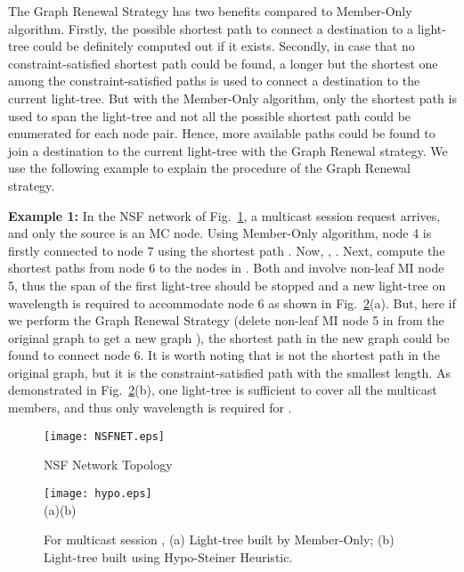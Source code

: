 \documentclass[conference]{IEEEtran}
\begin{document}
The Graph Renewal Strategy has two benefits compared to Member-Only algorithm. Firstly, the possible shortest path to connect a destination to a light-tree could be definitely computed out if it exists. Secondly, in case that no constraint-satisfied shortest path could be found, a longer but the shortest one among the constraint-satisfied paths is used to connect a destination to the current light-tree. But with the Member-Only algorithm, only the shortest path is used to span the light-tree and not all the possible shortest path could be enumerated for each node pair. Hence, more available paths could be found to join a destination to the current light-tree with the Graph Renewal strategy. We use the following example to explain the procedure of the Graph Renewal strategy.

\textbf{Example 1:}
In the NSF network of Fig.~\ref{fig: NSFnet}, a multicast session  request arrives, and only the source is an MC node. Using Member-Only algorithm, node 4 is firstly connected to node 7 using the shortest path . Now, , . Next, compute the shortest paths from node 6 to the nodes in .  Both  and  involve non-leaf MI node 5, thus the span of the first light-tree  should be stopped and a new light-tree  on wavelength  is required to accommodate node 6 as shown in Fig.~\ref{fig: hypo}(a). But, here if we perform the Graph Renewal Strategy (delete non-leaf MI node 5 in  from the original graph  to get a new graph ), the shortest path  in the new graph  could be found to connect node 6. It is worth noting that  is not the shortest path in the original graph, but it is the constraint-satisfied path with the smallest length. As demonstrated in Fig.~\ref{fig: hypo}(b), one light-tree is sufficient to cover all the multicast members, and thus only wavelength  is required for .

    \begin{figure}
\begin{center}
        \texttt{[image: NSFNET.eps]}
        \end{center}
\caption{NSF Network Topology}
        \label{fig: NSFnet}       \end{figure}

    \begin{figure}
        \centering
        \texttt{[image: hypo.eps]}\\
        \mbox{(a)}\hspace{.8in}\mbox{(b)}
        \caption{For multicast session , (a) Light-tree built by Member-Only; (b) Light-tree built using Hypo-Steiner Heuristic.}
        \label{fig: hypo}
    \end{figure}
\end{document}
